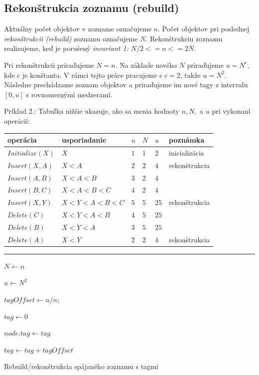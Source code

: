 \documentclass[
  digital,     %
  oneside,     %
  nosansbold,  %
  nocolorbold, %
  lof,         %
  lot,         %
]{fithesis4}
\begin{document}
\subsection{Rekonštrukcia zoznamu (rebuild)}

Aktuálny počet objektov v zozname označujeme $n$. Počet objektov pri poslednej \textit{rekonštrukcii (rebuild)} zoznamu označujeme $N$. Rekonštrukciu zoznamu realizujeme, keď je porušený \textit{invariant 1:} $N/2 <= n <= 2N$.

Pri rekonštrukcii priraďujeme $N = n$. Na základe nového $N$ priraďujeme $u = N^c$, kde $c$ je konštanta. V rámci tejto práce pracujeme s $c = 2$, takže $u = N^2$. Následne prechádzame zoznam objektov a priraďujeme im nové tagy z intervalu $[0, u]$ s rovnomernými medzerami.

Príklad 2.:
Tabuľka nižšie ukazuje, ako sa menia hodnoty $n, N,$ a $u$ pri vykonaní operácií:
\begin{table}
\begin{tabularx}{\textwidth}{| l | l | l | l | l | l}
    operácia & usporiadanie & $n$ & $N$ & $u$ & poznámka \\
    \midrule
    $Initialize(X)$ & $X$ & $1$ & $1$ & $2$ & inicializácia\\
    $Insert(X, A)$ & $X < A$ & $2$ & $2$ & $4$ & rekonštrukcia\\
    $Insert(A, B)$ & $X < A < B$ & $3$ & $2$ & $4$ & \\
    $Insert(B, C)$ & $X < A < B < C$ & $4$ & $2$ & $4$ & \\
    $Insert(X, Y)$ & $X < Y < A < B < C$ & $5$ & $5$ & $25$ & rekonštrukcia\\
    $Delete(C)$ & $X < Y < A < B$ & $4$ & $5$ & $25$ & \\
    $Delete(B)$ & $X < Y < A $ & $3$ & $5$ & $25$ & \\
    $Delete(A)$ & $X < Y$ & $2$ & $2$ & $4$ & rekonštrukcia\\
  \end{tabularx}
\end{table}

\begin{algorithm}
\hrule\vspace{0.2em}
$N \leftarrow n$\;

$u \leftarrow N^2$\;

$tagOffset \leftarrow u / n$; 

$tag \leftarrow 0$\;

{
    $node.tag \leftarrow tag$\;
    
    $tag \leftarrow tag + tagOffset$\;
}

\caption{Rebuild/rekonštrukcia spájaného zoznamu s tagmi}
\end{algorithm}
\end{document}
